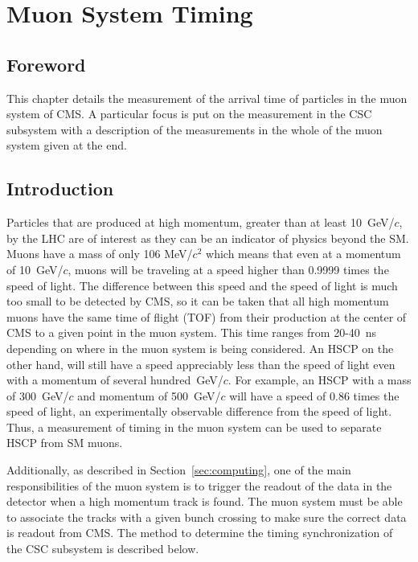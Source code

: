 \chapter{Muon System Timing \label{sec:timing}}

\section{Foreword}
This chapter details the measurement of the arrival time of particles in the muon system of CMS. A particular focus is put on the measurement in the CSC subsystem
with a description of the measurements in the whole of the muon system given at the end. 

\section{Introduction}
Particles that are produced at high momentum, greater than at least 10~GeV/$c$, by the LHC are of interest as they can be an indicator of physics
beyond the SM. Muons have a mass of only 106 MeV/$c^2$ which means that even at a momentum of 10~GeV/$c$, muons will be traveling at a speed higher than 0.9999
times the speed of light. The difference between this speed and the speed of light is much too small to be detected by CMS, so it can be
taken that all high momentum muons have the same time of flight (TOF) from their production at the center of CMS to a given point in the muon system.
This time ranges from 20-40~ns depending on where in the muon system is being considered. An HSCP on the other hand, will still have a speed appreciably less than the speed
of light even with a momentum of several hundred~GeV/$c$. For example, an HSCP with a mass of 300~GeV/$c$ and momentum of 500~GeV/$c$ will have a speed of
0.86 times the speed of light, an experimentally observable difference from the speed of light.
Thus, a measurement of timing in the muon system can be used to separate HSCP from SM muons.

Additionally, as described in Section~\ref{sec:computing}, one of the main responsibilities  of the muon system is to trigger the readout of the data in the detector
when a high momentum track is found. The muon system must be able to associate the tracks with a given bunch crossing to make sure the correct data is readout from CMS.
The method to determine the timing synchronization of the CSC subsystem is described below.

